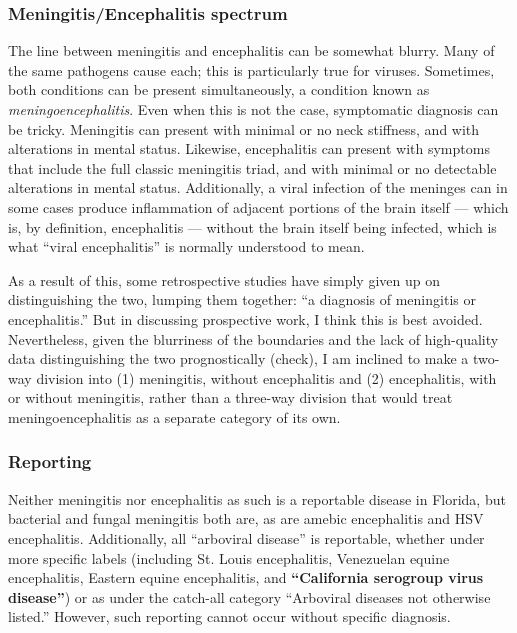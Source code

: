 \documentclass{article}
\begin{document}
        \subsubsection{Meningitis/Encephalitis spectrum}
            The line between meningitis and encephalitis can be somewhat blurry. Many of the same pathogens cause each; this is particularly true for viruses. Sometimes, both conditions can be present simultaneously, a condition known as \textit{meningoencephalitis}. Even when this is not the case, symptomatic diagnosis can be tricky. Meningitis can present with minimal or no neck stiffness, and with alterations in mental status. Likewise, encephalitis can present with symptoms that include the full classic meningitis triad, and with minimal or no detectable alterations in mental status. Additionally, a viral infection of the meninges can in some cases produce inflammation of adjacent portions of the brain itself --- which is, by definition, encephalitis --- without the brain itself being infected, which is what ``viral encephalitis'' is normally understood to mean.

            As a result of this, some retrospective studies have simply given up on distinguishing the two, lumping them together: ``a diagnosis of meningitis or encephalitis.'' But in discussing prospective work, I think this is best avoided. Nevertheless, given the blurriness of the boundaries and the lack of high-quality data distinguishing the two prognostically (check), I am inclined to make a two-way division into (1) meningitis, without encephalitis and (2) encephalitis, with or without meningitis, rather than a three-way division that would treat meningoencephalitis as a separate category of its own.
        
        \subsubsection{Reporting}
            Neither meningitis nor encephalitis as such is a reportable disease in Florida, but bacterial and fungal meningitis both are, as are amebic encephalitis and HSV encephalitis. Additionally, all ``arboviral disease'' is reportable, whether under more specific labels (including St. Louis encephalitis, Venezuelan equine encephalitis, Eastern equine encephalitis, and \textbf{``California serogroup virus disease''}) or as under the catch-all category ``Arboviral diseases not otherwise listed.'' However, such reporting cannot occur without specific diagnosis.
\end{document}
